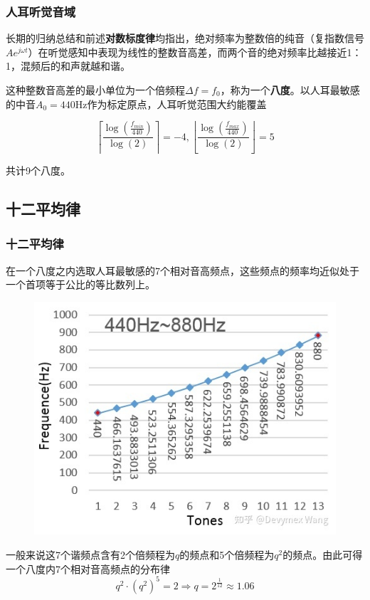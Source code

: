 \documentclass[utf8,10pt]{beamer}
\begin{document}
\begin{frame}
    \frametitle{人耳听觉音域}

    长期的归纳总结和前述\textbf{对数标度律}均指出，绝对频率为整数倍的纯音（复指数信号\(Ae^{j\omega t}\)）在听觉感知中表现为线性的整数音高差，而两个音的绝对频率比越接近1：1，混频后的和声就越和谐。

    这种整数音高差的最小单位为一个倍频程\(\Delta f=f_0\)，称为一个\textbf{八度}。以人耳最敏感的中音\(A_0=440\text{Hz}\)作为标定原点，人耳听觉范围大约能覆盖

    \begin{equation}
        \left\lceil \frac{\log(\frac{f_{min}}{440})}{\log(2)} \right\rceil=-4, \left\lfloor \frac{\log(\frac{f_{max}}{440})}{\log(2)} \right\rfloor=5
    \end{equation}

    共计9个八度。

\end{frame}

\subsection{十二平均律}
\begin{frame}
    \frametitle{十二平均律}

    在一个八度之内选取人耳最敏感的7个相对音高频点，这些频点的频率均近似处于一个首项等于公比的等比数列上。

    \begin{figure}[htpb]
        \centering
        \includegraphics[height=0.4\textheight]{figures/20221117120845.png}
    \end{figure}

    一般来说这7个谐频点含有2个倍频程为\(q\)的频点和5个倍频程为\(q^{2}\)的频点。由此可得一个八度内7个相对音高频点的分布律
    \begin{equation}
        q^{2}\cdot (q^{2})^{5}=2\Rightarrow q=2^{\frac{1}{12}}\approx 1.06
    \end{equation}

\end{frame}
\end{document}
